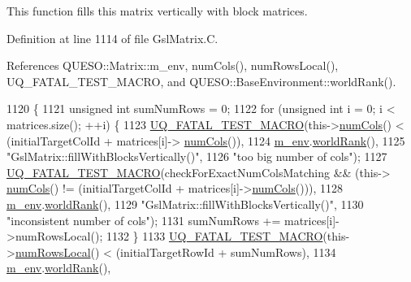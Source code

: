 This function fills {\ttfamily this} matrix vertically with block matrices. 



Definition at line 1114 of file Gsl\-Matrix.\-C.



References Q\-U\-E\-S\-O\-::\-Matrix\-::m\-\_\-env, num\-Cols(), num\-Rows\-Local(), U\-Q\-\_\-\-F\-A\-T\-A\-L\-\_\-\-T\-E\-S\-T\-\_\-\-M\-A\-C\-R\-O, and Q\-U\-E\-S\-O\-::\-Base\-Environment\-::world\-Rank().


\begin{DoxyCode}
1120 \{
1121   \textcolor{keywordtype}{unsigned} \textcolor{keywordtype}{int} sumNumRows = 0;
1122   \textcolor{keywordflow}{for} (\textcolor{keywordtype}{unsigned} \textcolor{keywordtype}{int} i = 0; i < matrices.size(); ++i) \{
1123     \hyperlink{_defines_8h_a56d63d18d0a6d45757de47fcc06f574d}{UQ\_FATAL\_TEST\_MACRO}(this->\hyperlink{class_q_u_e_s_o_1_1_gsl_matrix_ad5005f168fe030468e834776afb1859b}{numCols}() < (initialTargetColId + matrices[i]->
      \hyperlink{class_q_u_e_s_o_1_1_gsl_matrix_ad5005f168fe030468e834776afb1859b}{numCols}()),
1124                         \hyperlink{class_q_u_e_s_o_1_1_matrix_a247fb0fc0b87fecdee054bb4660b68e8}{m\_env}.\hyperlink{class_q_u_e_s_o_1_1_base_environment_a78b57112bbd0e6dd0e8afec00b40ffa7}{worldRank}(),
1125                         \textcolor{stringliteral}{"GslMatrix::fillWithBlocksVertically()"},
1126                         \textcolor{stringliteral}{"too big number of cols"});
1127     \hyperlink{_defines_8h_a56d63d18d0a6d45757de47fcc06f574d}{UQ\_FATAL\_TEST\_MACRO}(checkForExactNumColsMatching && (this->
      \hyperlink{class_q_u_e_s_o_1_1_gsl_matrix_ad5005f168fe030468e834776afb1859b}{numCols}() != (initialTargetColId + matrices[i]->\hyperlink{class_q_u_e_s_o_1_1_gsl_matrix_ad5005f168fe030468e834776afb1859b}{numCols}())),
1128                         \hyperlink{class_q_u_e_s_o_1_1_matrix_a247fb0fc0b87fecdee054bb4660b68e8}{m\_env}.\hyperlink{class_q_u_e_s_o_1_1_base_environment_a78b57112bbd0e6dd0e8afec00b40ffa7}{worldRank}(),
1129                         \textcolor{stringliteral}{"GslMatrix::fillWithBlocksVertically()"},
1130                         \textcolor{stringliteral}{"inconsistent number of cols"});
1131     sumNumRows += matrices[i]->numRowsLocal();
1132   \}
1133   \hyperlink{_defines_8h_a56d63d18d0a6d45757de47fcc06f574d}{UQ\_FATAL\_TEST\_MACRO}(this->\hyperlink{class_q_u_e_s_o_1_1_gsl_matrix_ab5ec937a9fd439eef1a87e12c0dbccb4}{numRowsLocal}() < (initialTargetRowId + 
      sumNumRows),
1134                       \hyperlink{class_q_u_e_s_o_1_1_matrix_a247fb0fc0b87fecdee054bb4660b68e8}{m\_env}.\hyperlink{class_q_u_e_s_o_1_1_base_environment_a78b57112bbd0e6dd0e8afec00b40ffa7}{worldRank}(),

\end{DoxyCode}
